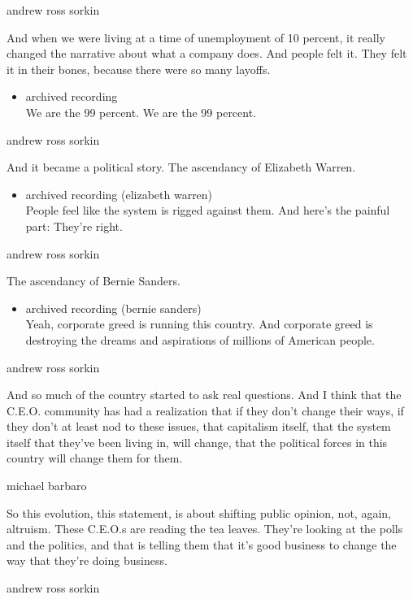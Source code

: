 andrew ross sorkin

And when we were living at a time of unemployment of 10 percent, it
really changed the narrative about what a company does. And people felt
it. They felt it in their bones, because there were so many layoffs.

\begin{itemize}
\tightlist
\item
  archived recording\\
  We are the 99 percent. We are the 99 percent.
\end{itemize}

andrew ross sorkin

And it became a political story. The ascendancy of Elizabeth Warren.

\begin{itemize}
\tightlist
\item
  archived recording (elizabeth warren)\\
  People feel like the system is rigged against them. And here's the
  painful part: They're right.
\end{itemize}

andrew ross sorkin

The ascendancy of Bernie Sanders.

\begin{itemize}
\tightlist
\item
  archived recording (bernie sanders)\\
  Yeah, corporate greed is running this country. And corporate greed is
  destroying the dreams and aspirations of millions of American people.
\end{itemize}

andrew ross sorkin

And so much of the country started to ask real questions. And I think
that the C.E.O. community has had a realization that if they don't
change their ways, if they don't at least nod to these issues, that
capitalism itself, that the system itself that they've been living in,
will change, that the political forces in this country will change them
for them.

michael barbaro

So this evolution, this statement, is about shifting public opinion,
not, again, altruism. These C.E.O.s are reading the tea leaves. They're
looking at the polls and the politics, and that is telling them that
it's good business to change the way that they're doing business.

andrew ross sorkin

